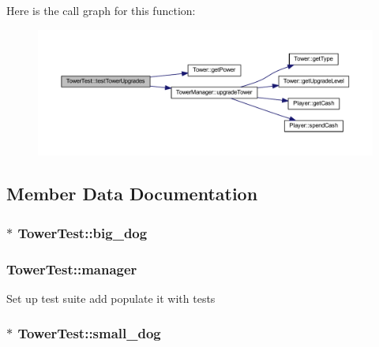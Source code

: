 Here is the call graph for this function\+:\nopagebreak
\begin{figure}[H]
\begin{center}
\leavevmode
\includegraphics[width=350pt]{class_tower_test_ace6c736cadac380b8d9adf0d7c853979_cgraph}
\end{center}
\end{figure}




\subsection{Member Data Documentation}
\hypertarget{class_tower_test_a9468a416c0811ad87dcc103385d8a248}{
\subsubsection[{big\+\_\+dog}]{$\ast$ Tower\+Test\+::big\+\_\+dog\hspace{0.3cm}{\ttfamily [private]}}}\label{class_tower_test_a9468a416c0811ad87dcc103385d8a248}
\hypertarget{class_tower_test_aeef90091c2db96edb1f6610b0e2d3715}{
\subsubsection[{manager}]{ Tower\+Test\+::manager\hspace{0.3cm}{\ttfamily [private]}}}\label{class_tower_test_aeef90091c2db96edb1f6610b0e2d3715}
Set up test suite add populate it with tests \hypertarget{class_tower_test_aef4dab96f03105798c39ca8d33ae6940}{
\subsubsection[{small\+\_\+dog}]{$\ast$ Tower\+Test\+::small\+\_\+dog\hspace{0.3cm}{\ttfamily [private]}}}\label{class_tower_test_aef4dab96f03105798c39ca8d33ae6940}



